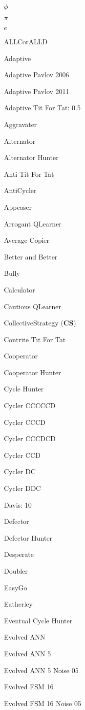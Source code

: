 \item $\phi$
\item $\pi$
\item $e$
\item ALLCorALLD
\item Adaptive
\item Adaptive Pavlov 2006
\item Adaptive Pavlov 2011
\item Adaptive Tit For Tat: 0.5
\item Aggravater
\item Alternator
\item Alternator Hunter
\item Anti Tit For Tat
\item AntiCycler
\item Appeaser
\item Arrogant QLearner
\item Average Copier
\item Better and Better
\item Bully
\item Calculator
\item Cautious QLearner
\item CollectiveStrategy
(\textbf{CS})\item Contrite Tit For Tat
\item Cooperator
\item Cooperator Hunter
\item Cycle Hunter
\item Cycler CCCCCD
\item Cycler CCCD
\item Cycler CCCDCD
\item Cycler CCD
\item Cycler DC
\item Cycler DDC
\item Davis: 10
\item Defector
\item Defector Hunter
\item Desperate
\item Doubler
\item EasyGo
\item Eatherley
\item Eventual Cycle Hunter
\item Evolved ANN
\item Evolved ANN 5
\item Evolved ANN 5 Noise 05
\item Evolved FSM 16
\item Evolved FSM 16 Noise 05
